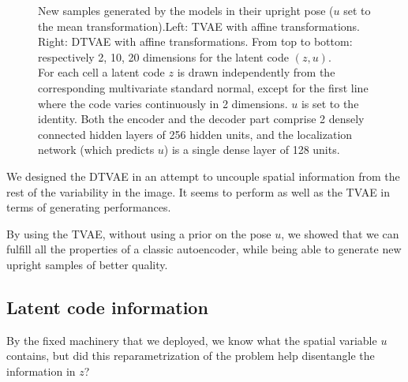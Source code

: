 \documentclass[letterpaper, twoside]{article}
\begin{document}
\begin{figure}[H]
\caption{New samples generated by the models in their upright pose ($u$ set to the mean transformation).Left: TVAE with affine transformations. Right: DTVAE with affine transformations. From top to bottom: respectively 2, 10, 20 dimensions for the latent code $(z, u)$.\\ For each cell a latent code $z$ is drawn independently from the corresponding multivariate standard normal, except for the first line where the code varies continuously in 2 dimensions. $u$ is set to the identity. Both the encoder and the decoder part comprise 2 densely connected hidden layers of 256 hidden units, and the localization network (which predicts $u$) is a single dense layer of 128 units.}
\label{generatedcomparison2}
\end{figure}

  We designed the DTVAE in an attempt to uncouple spatial information from the rest of the variability in the image. It seems to perform as well as the TVAE in terms of generating performances.


  By using the TVAE, without using a prior on the pose $u$, we showed that we can fulfill all the properties of a classic autoencoder, while being able to generate new upright samples of better quality.

  \subsection{Latent code information}
    By the fixed machinery that we deployed, we know what the spatial variable $u$ contains, but did this reparametrization of the problem help disentangle the information in $z$?
\end{document}
